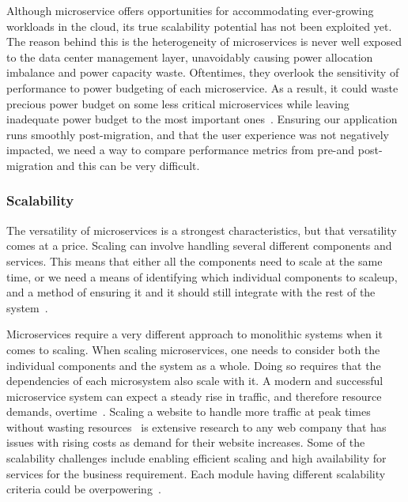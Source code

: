 \par Although microservice offers opportunities for accommodating ever-growing workloads in the cloud, its true scalability potential has not been exploited yet. The reason behind this is the heterogeneity of microservices is never well exposed to the data center management layer, unavoidably causing power allocation imbalance and power capacity waste. Oftentimes, they overlook the sensitivity of performance to power budgeting of each microservice. As a result, it could waste precious power budget on some less critical microservices while leaving inadequate power budget to the most important ones~\cite{Hou2019}. Ensuring our application runs smoothly post-migration, and that the user experience was not negatively impacted, we need a way to compare performance metrics from pre-and post-migration and this can be very difficult.


\subsubsection{Scalability}%

The versatility of microservices is a strongest characteristics, but that versatility comes at a price. Scaling can involve handling several different components and services. This means that either all the components need to scale at the same time, or we need a means of identifying which individual components to scaleup, and a method of ensuring it and it should still integrate with the rest of the system~\cite{Meshenberg2016}. 

\par Microservices require a very different approach to monolithic systems when it comes to scaling. When scaling microservices, one needs to consider both the individual components and the system as a whole. Doing so requires that the dependencies of each microsystem also scale with it. %
A modern and successful microservice system can expect a steady rise in traffic, and therefore resource demands, overtime~\cite{Etsy, Soundcloud}. 
Scaling a website to handle more traffic at peak times without wasting resources~\cite{McElhiney2018} is extensive research to any web company that has issues with rising costs as demand for their website increases. Some of the scalability challenges include enabling efficient scaling and high availability for services for the business requirement. Each module having different scalability criteria could be overpowering~\cite{khan2020}. 

